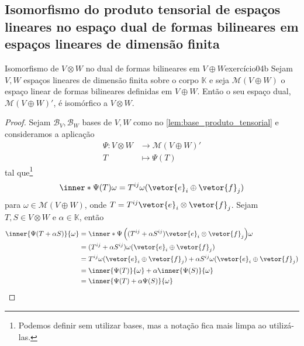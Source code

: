 \subsection{Isomorfismo do produto tensorial de espaços lineares no espaço dual de formas bilineares em espaços lineares de dimensão finita}

\begin{proposition}{Isomorfismo de \(V \otimes W\) no dual de formas bilineares em \(V \oplus W\)}{exercício04b}
    Sejam \(V, W\) espaços lineares de dimensão finita sobre o corpo \(\mathbb{K}\) e seja \(\mathscr{M}(V \oplus W)\) o espaço linear de formas bilineares definidas em \(V \oplus W\). Então o seu espaço dual, \(\mathscr{M}(V \oplus W)'\), é isomórfico a \(V \otimes W\).
\end{proposition}
\begin{proof}
    Sejam \(\mathscr{B}_V, \mathscr{B}_W\) bases de \(V, W\) como no \cref{lem:base_produto_tensorial} e consideramos a aplicação
    \begin{align*}
        \Psi : V \otimes W &\to \mathscr{M}(V \oplus W)'\\
                         T &\mapsto \Psi(T)
    \end{align*}
    tal que\footnote{Podemos definir sem utilizar bases, mas a notação fica mais limpa ao utilizá-las.}
    \begin{equation*}
        \inner*{\Psi(T)}{\omega} = T^{ij}\omega(\vetor{e}_{i} \oplus \vetor{f}_{j})
    \end{equation*}
    para \(\omega \in \mathscr{M}(V \oplus W)\), onde \(T = T^{ij}\vetor{e}_i\otimes \vetor{f}_j\). Sejam \(T, S\in V \otimes W\) e \(\alpha \in \mathbb{K}\), então
    \begin{align*}
        \inner{\Psi(T + \alpha S)}{\omega} &= \inner*{\Psi\left((T^{ij} + \alpha S^{ij})\vetor{e}_i\otimes \vetor{f}_j\right)}{\omega}\\
                                           &= (T^{ij} + \alpha S^{ij})\omega(\vetor{e}_i \oplus \vetor{f}_j)\\
                                           &= T^{ij} \omega(\vetor{e}_i\oplus \vetor{f}_j) + \alpha S^{ij} \omega(\vetor{e}_i \oplus \vetor{f}_j)\\
                                           &= \inner{\Psi(T)}{\omega} + \alpha \inner{\Psi(S)}{\omega}\\
                                           &= \inner{\Psi(T) + \alpha \Psi(S)}{\omega}
    \end{align*}

\end{proof}

